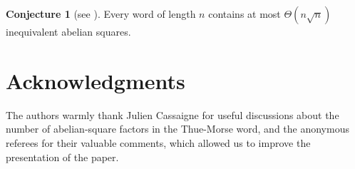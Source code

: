 \documentclass[11pt,reqno]{amsart}
\numberwithin{equation}{section}
\theoremstyle{plain}
\theoremstyle{definition}
\newtheorem{conjecture}[theorem]{Conjecture}
\theoremstyle{remark}
\begin{document}
\begin{conjecture}[see \cite{Ry14,warsaw2}]
 Every word of length $n$ contains at most $\Theta(n\sqrt{n})$ inequivalent abelian squares.
\end{conjecture}


\section{Acknowledgments}

The authors warmly thank Julien Cassaigne for useful discussions about the
number of abelian-square factors in the Thue-Morse word, and the anonymous referees for their valuable comments, which allowed us to improve the presentation of the paper.



\newcommand{\noopsort}[1]{} \newcommand{\singleletter}[1]{#1}
\end{document}
